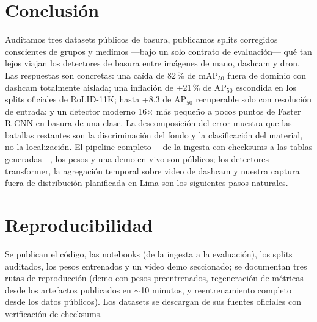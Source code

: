 \documentclass[conference]{IEEEtran}
\begin{document}
\section{Conclusión}
Auditamos tres datasets públicos de basura, publicamos splits corregidos
conscientes de grupos y medimos ---bajo un solo contrato de evaluación--- qué
tan lejos viajan los detectores de basura entre imágenes de mano, dashcam y
dron. Las respuestas son concretas: una caída de 82\,\% de mAP$_{50}$ fuera de
dominio con dashcam totalmente aislada; una inflación de +21\,\% de AP$_{50}$
escondida en los splits oficiales de RoLID-11K; hasta +8.3 de AP$_{50}$
recuperable solo con resolución de entrada; y un detector moderno 16$\times$ más
pequeño a pocos puntos de Faster R-CNN en basura de una clase. La descomposición
del error muestra que las batallas restantes son la discriminación del fondo y
la clasificación del material, no la localización. El pipeline completo ---de la
ingesta con checksums a las tablas generadas---, los pesos y una demo en vivo
son públicos; los detectores transformer, la agregación temporal sobre video de
dashcam y nuestra captura fuera de distribución planificada en Lima son los
siguientes pasos naturales.

\section*{Reproducibilidad}
Se publican el código, las notebooks (de la ingesta a la evaluación), los splits
auditados, los pesos entrenados y un video demo seccionado; se documentan tres
rutas de reproducción (demo con pesos preentrenados, regeneración de métricas
desde los artefactos publicados en $\sim$10 minutos, y reentrenamiento completo
desde los datos públicos). Los datasets se descargan de sus fuentes oficiales
con verificación de checksums.



\end{document}
